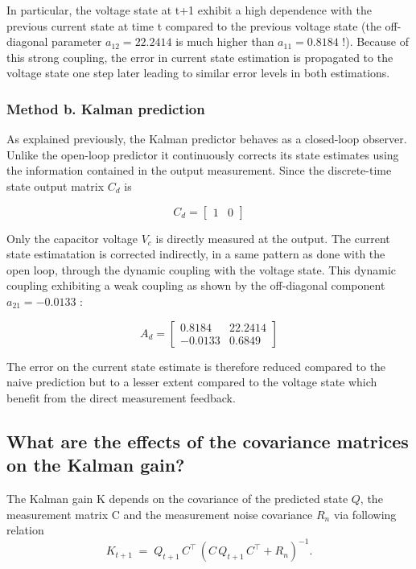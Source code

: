 In particular, the voltage state at t+1 exhibit a high dependence with the previous current state at time t compared to the previous voltage state (the off-diagonal parameter $a_{12} = 22.2414$ is much higher than $a_{11} = 0.8184$ !).
Because of this strong coupling, the error in current state estimation is propagated to the voltage state one step later leading to similar error levels in both estimations.

\subsubsection{Method b. Kalman prediction}

As explained previously, the Kalman predictor behaves as a closed-loop observer.  Unlike the open-loop predictor it continuously corrects its state estimates using the information contained in the output measurement.
Since the discrete-time state output matrix $C_d$ is 

\begin{equation}
C_d = \begin{bmatrix}
1 & 0 
\end{bmatrix}
\end{equation}

Only the capacitor voltage $V_c$ is directly measured at the output.  The current state estimatation is corrected indirectly, in a same pattern as done with the open loop, through the dynamic coupling with the voltage state.
This dynamic coupling exhibiting a weak coupling as shown by the off-diagonal component $a_{21} = -0.0133$ :

\begin{equation}
A_d = \begin{bmatrix}
0.8184 & 22.2414 \\
-0.0133 & 0.6849
\end{bmatrix}
\end{equation}

The error on the current state estimate is therefore reduced compared to the naive prediction but to a lesser extent compared to the voltage state which benefit from the direct measurement feedback.

\subsection{What are the effects of the covariance matrices on the Kalman gain?}

The Kalman gain K depends on the covariance of the predicted state \(Q\), the measurement matrix C and the measurement noise covariance \(R_n\) via following relation
\[
K_{t+1} \;=\; Q_{t+1}\,C^\top\,(C\,Q_{t+1}\,C^\top + R_n)^{-1}.
\]

